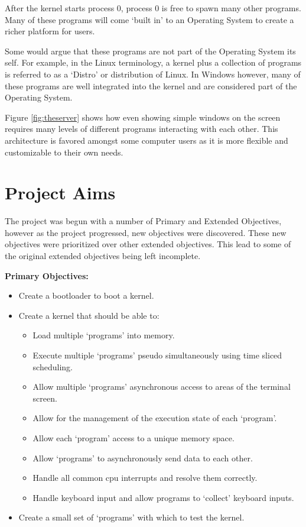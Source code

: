 \documentclass[a4paper]{report}
\begin{document}
After the kernel starts process 0, process 0 is free to spawn many other programs. Many of these programs will come `built in' to an Operating System to create a richer platform for users.

Some would argue that these programs are not part of the Operating System its self. For example, in the Linux terminology, a kernel plus a collection of programs is referred to as a `Distro' or distribution of Linux. In Windows however, many of these programs are well integrated into the kernel and are considered part of the Operating System.

Figure \ref{fig:theserver} shows how even showing simple windows on the screen requires many levels of different programs interacting with each other. This architecture is favored amongst some computer users as it is more flexible and customizable to their own needs.
















\clearpage
\section {Project Aims}

The project was begun with a number of Primary and Extended Objectives, however as the project progressed, new objectives were discovered. These new objectives were prioritized over other extended objectives. This lead to some of the original extended objectives being left incomplete.

\textbf {Primary Objectives:}

\begin{itemize}
\item Create a bootloader to boot a kernel.
\item Create a kernel that should be able to:
\begin{itemize}
\item Load multiple `programs' into memory.
\item Execute multiple `programs' pseudo simultaneously using time sliced scheduling.
\item Allow multiple `programs' asynchronous access to areas of the terminal screen.
\item Allow for the management of the execution state of each `program'.
\item Allow each `program' access to a unique memory space.
\item Allow `programs' to asynchronously send data to each other.
\item Handle all common cpu interrupts and resolve them correctly.
\item Handle keyboard input and allow programs to `collect' keyboard inputs.
\end{itemize}
\item Create a small set of `programs' with which to test the kernel.
\end{itemize}
\end{document}
